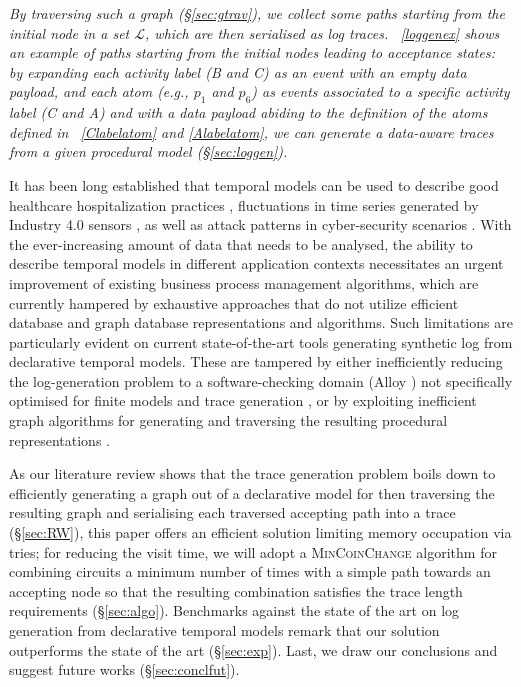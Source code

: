 \documentclass[sigconf]{acmart}
\begin{document}
\textit{By traversing such a graph (\S\ref{sec:gtrav}), we collect some paths starting from the  initial node in a set $\mathcal{L}$, which are then serialised as log traces. \figurename~\ref{loggenex} shows an example of paths starting from the initial nodes leading to acceptance states: by expanding each activity label (\textsf{B} and \textsf{C}) as an event with an empty data payload, and  each atom (e.g., $p_1$ and $p_6$) as events associated to a specific activity label (\textsf{C} and \textsf{A}) and with a data payload abiding to the definition of the atoms defined in \tablename~\ref{Clabelatom} and \ref{Alabelatom}, we can generate a data-aware traces  from a given procedural model  (\S\ref{sec:loggen}).}



It has been long established that temporal models can be used to describe good healthcare hospitalization practices \cite{Xu2020}, fluctuations in time series generated by Industry 4.0 sensors \cite{j.eswa.2022.117176}, as well as attack patterns in cyber-security scenarios \cite{info14030173}. With the ever-increasing amount of data that needs to be analysed, the ability to describe temporal models in different application contexts necessitates an urgent improvement of existing business process management algorithms, which are currently hampered by exhaustive approaches that do not utilize efficient database and graph database representations and algorithms. Such limitations are particularly evident on current state-of-the-art tools generating synthetic log from declarative temporal models. These are tampered by either inefficiently reducing the log-generation problem to a software-checking domain ({Alloy} \cite{DBLP:books/daglib/0024034}) not specifically optimised for finite models  and trace generation \cite{DBLP:conf/bpm/SkydanienkoFGM18}, or by exploiting inefficient graph algorithms for generating and traversing the resulting procedural representations \cite{DBLP:conf/caise/CiccioBCM15}. 


As our literature review shows that the trace generation problem boils down to efficiently generating a graph out of a declarative model for then traversing the resulting graph and serialising each traversed accepting path into a trace (\S\ref{sec:RW}), this paper offers an efficient solution limiting  memory occupation via tries; for reducing the visit time, we will adopt a \textsc{MinCoinChange} algorithm for combining circuits a minimum number of times with a simple path towards an accepting node so that the resulting combination satisfies the trace length requirements (\S\ref{sec:algo}). Benchmarks against the state of the art on log generation from declarative temporal models remark that our solution outperforms the state of the art (\S\ref{sec:exp}). Last, we draw our conclusions and suggest future works (\S\ref{sec:conclfut}).
\end{document}
